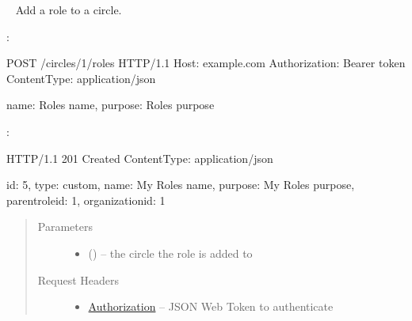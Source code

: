 \documentclass[letterpaper,10pt,english]{sphinxmanual}
\begin{document}
\begin{DUlineblock}{0em}
\item[] 
\end{DUlineblock}


\begin{fulllineitems}
\label{\detokenize{resources/circle:post--circles-(circle_id)-roles}}~
Add a role to a circle.

:

\begin{sphinxVerbatim}[commandchars=\\\{\}]
POST /circles/1/roles HTTP/1.1
Host: example.com
Authorization: Bearer \PYGZlt{}token\PYGZgt{}
Content\PYGZhy{}Type: application/json

\PYGZob{}
    \PYGZsq{}name\PYGZsq{}: \PYGZsq{}Role\PYGZsq{}s name\PYGZsq{},
    \PYGZsq{}purpose\PYGZsq{}: \PYGZsq{}Role\PYGZsq{}s purpose\PYGZsq{}
\PYGZcb{}
\end{sphinxVerbatim}

:

\begin{sphinxVerbatim}[commandchars=\\\{\}]
HTTP/1.1 201 Created
Content\PYGZhy{}Type: application/json

\PYGZob{}
    \PYGZsq{}id\PYGZsq{}: 5,
    \PYGZsq{}type\PYGZsq{}: \PYGZsq{}custom\PYGZsq{},
    \PYGZsq{}name\PYGZsq{}: \PYGZsq{}My Role\PYGZsq{}s name\PYGZsq{},
    \PYGZsq{}purpose\PYGZsq{}: \PYGZsq{}My Role\PYGZsq{}s purpose\PYGZsq{},
    \PYGZsq{}parent\PYGZus{}role\PYGZus{}id\PYGZsq{}: 1,
    \PYGZsq{}organization\PYGZus{}id\PYGZsq{}: 1
\PYGZcb{}
\end{sphinxVerbatim}
\begin{quote}\begin{description}
\item[{Parameters}] \leavevmode\begin{itemize}
\item {} 
 () -- the circle the role is added to

\end{itemize}

\item[{Request Headers}] \leavevmode\begin{itemize}
\item {} 
\href{http://tools.ietf.org/html/rfc7235\#section-4.2}{Authorization} -- JSON Web Token to authenticate


\end{itemize}
\end{description}
\end{quote}
\end{fulllineitems}
\end{document}
